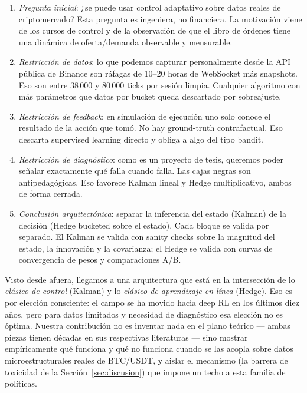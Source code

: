 \documentclass[journal,onecolumn,11pt]{IEEEtran}
\begin{document}
\begin{enumerate}
\item \emph{Pregunta inicial}: ¿se puede usar control adaptativo
      sobre datos reales de criptomercado? Esta pregunta es
      ingeniera, no financiera. La motivación viene de los cursos
      de control y de la observación de que el libro de órdenes
      tiene una dinámica de oferta/demanda observable y mensurable.
\item \emph{Restricción de datos}: lo que podemos capturar
      personalmente desde la API pública de Binance son ráfagas de
      10--20 horas de WebSocket más snapshots. Eso son entre 38\,000
      y 80\,000 ticks por sesión limpia. Cualquier algoritmo con
      más parámetros que datos por bucket queda descartado por
      sobreajuste.
\item \emph{Restricción de feedback}: en simulación de ejecución
      uno solo conoce el resultado de la acción que tomó. No hay
      ground-truth contrafactual. Eso descarta supervised learning
      directo y obliga a algo del tipo bandit.
\item \emph{Restricción de diagnóstico}: como es un proyecto de
      tesis, queremos poder señalar exactamente qué falla cuando
      falla. Las cajas negras son antipedagógicas. Eso favorece
      Kalman lineal y Hedge multiplicativo, ambos de forma cerrada.
\item \emph{Conclusión arquitectónica}: separar la inferencia
      del estado (Kalman) de la decisión (Hedge bucketed sobre el
      estado). Cada bloque se valida por separado.
      El Kalman se valida con sanity checks sobre la magnitud del
      estado, la innovación y la covarianza; el Hedge se valida
      con curvas de convergencia de pesos y comparaciones A/B.
\end{enumerate}

\noindent
Visto desde afuera, llegamos a una arquitectura que está en la
intersección de lo \emph{clásico de control} (Kalman) y lo
\emph{clásico de aprendizaje en línea} (Hedge). Eso es por
elección consciente: el campo se ha movido hacia deep RL en los
últimos diez años, pero para datos limitados y necesidad de
diagnóstico esa elección no es óptima. Nuestra contribución no es
inventar nada en el plano teórico --- ambas piezas tienen décadas
en sus respectivas literaturas --- sino mostrar empíricamente
qué funciona y qué no funciona cuando se las acopla sobre datos
microestructurales reales de BTC/USDT, y aislar el mecanismo
(la barrera de toxicidad de la Sección~\ref{sec:discusion}) que
impone un techo a esta familia de políticas.
\end{document}
